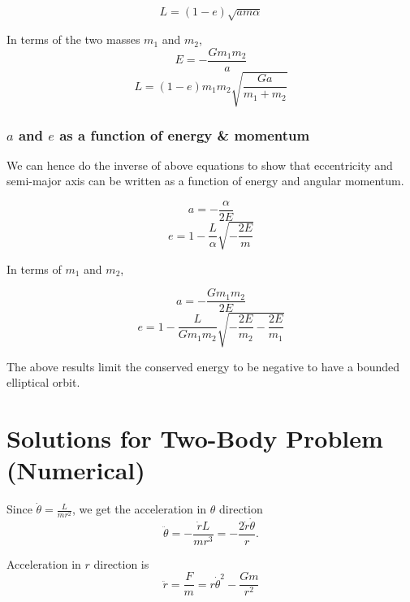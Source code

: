 \documentclass{article}
\begin{document}
\begin{equation}
    L = (1-e) \sqrt{am\alpha}
\end{equation}

In terms of the two masses $m_1$ and $m_2$,
\begin{equation}
    E = -\frac{Gm_1 m_2}{a}
\end{equation}
\begin{equation}
    L = (1-e) m_1 m_2 \sqrt{\frac{Ga}{m_1+m_2}}
\end{equation}

\subsubsection{$a$ and $e$ as a function of energy \& momentum}
We can hence do the inverse of above equations to show that eccentricity and semi-major axis can be written as a function of energy and angular momentum.

\begin{equation}
    a = - \frac{\alpha}{2E}
\end{equation}
\begin{equation}
    e = 1- \frac{L}{\alpha}\sqrt{-\frac{2E}{m}}
\end{equation}

In terms of $m_1$ and $m_2$,

\begin{equation}
    a = - \frac{Gm_1 m_2}{2E}
\end{equation}
\begin{equation}
    e = 1- \frac{L}{Gm_1 m_2} \sqrt{- \frac{2E}{m_2} - \frac{2E}{m_1}}
\end{equation}

The above results limit the conserved energy to be negative to have a bounded elliptical orbit.


\section{Solutions for Two-Body Problem (Numerical)}

Since $\dot{\theta} = \frac{L}{mr^2}$, we get the acceleration in $\theta$ direction
\begin{equation}
    \ddot{\theta} = - \frac{\dot{r} L}{mr^3} = -\frac{2\dot{r}\dot{\theta}}{r}.
\end{equation}

Acceleration in $r$ direction is
\begin{equation}
    \ddot{r} = \frac{F}{m} = r \dot{\theta}^2 - \frac{Gm}{r^2}
\end{equation}
\end{document}
